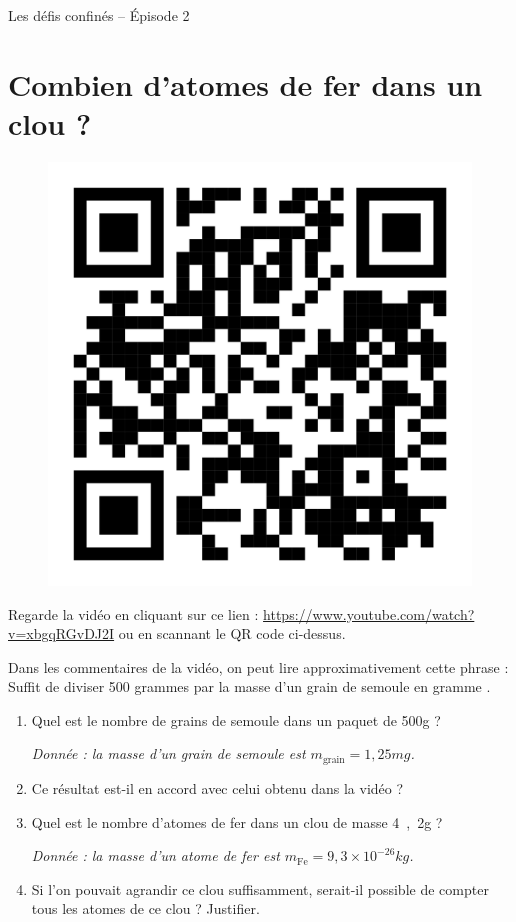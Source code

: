 \documentclass[12pt,a4paper]{article}
\begin{document}
\begin{header}
Les défis confinés -- Épisode 2
\end{header}

\section*{Combien d'atomes de fer dans un clou ?}

\begin{figure}[h]
\center
\includegraphics[scale=0.05]{images/qr_lqc_semoule.png}
\end{figure}

Regarde la vidéo en cliquant sur ce lien : \href{https://www.youtube.com/watch?v=xbgqRGvDJ2I}{https://www.youtube.com/watch?v=xbgqRGvDJ2I} ou en scannant le QR code ci-dessus.

Dans les commentaires de la vidéo, on peut lire approximativement cette phrase :
\og Suffit de diviser 500 grammes par la masse d'un grain de semoule en gramme \fg{}.

\begin{enumerate}
\item Quel est le nombre de grains de semoule dans un paquet de \unit{500}{g} ?

\emph{Donnée : la masse d'un grain de semoule est $m_\mathrm{grain}=\unit{1{,}25}{mg}$.}

\item Ce résultat est-il en accord avec celui obtenu dans la vidéo ?

\item Quel est le nombre d'atomes de fer dans un clou de masse \unit{4{,}2}{g} ?

\emph{Donnée : la masse d'un atome de fer est $m_\mathrm{Fe} = \unit{9{,}3\times 10^{-26}}{kg}$.}

\item Si l'on pouvait agrandir ce clou suffisamment, serait-il possible de compter tous les atomes de ce clou ?
Justifier.
\end{enumerate}
\end{document}
